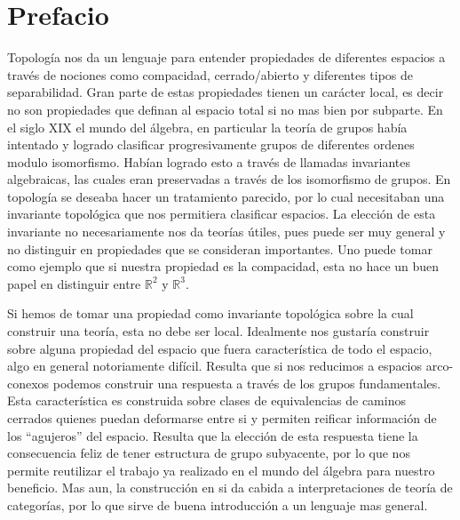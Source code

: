 \section{Prefacio}
Topología nos da un lenguaje para entender propiedades de diferentes
espacios a través de nociones como compacidad, cerrado/abierto y
diferentes tipos
de separabilidad. Gran parte de estas propiedades tienen un carácter
local, es decir no son propiedades que definan al espacio total si no mas
bien por subparte. En el siglo XIX el mundo del álgebra, en
particular la teoría de grupos había intentado y logrado clasificar
progresivamente grupos de diferentes ordenes modulo isomorfismo. Habían
logrado esto a través de llamadas invariantes algebraicas, las cuales
eran preservadas a través de los isomorfismo de grupos. En topología se
deseaba hacer un tratamiento parecido, por lo cual necesitaban una
invariante topológica que nos permitiera clasificar espacios. La elección
de esta invariante no necesariamente nos da teorías útiles, pues puede
ser muy general y no distinguir en propiedades que se consideran
importantes. Uno puede tomar como ejemplo que si nuestra propiedad es
la compacidad, esta no hace un buen papel en distinguir entre
\(\mathbb{R}^2\) y \(\mathbb{R}^3\).

Si hemos de tomar una propiedad como invariante topológica sobre la cual
construir una teoría, esta no debe ser local. Idealmente nos gustaría
construir sobre alguna propiedad del espacio que fuera característica de
todo el espacio, algo en general notoriamente difícil. Resulta que si nos
reducimos a espacios arco-conexos podemos construir una respuesta a través
de los grupos fundamentales. Esta característica es construida sobre
clases de equivalencias de caminos cerrados quienes puedan deformarse
entre si y permiten reificar información de los ``agujeros'' del espacio.
Resulta que la elección de esta respuesta tiene la consecuencia feliz de
tener estructura de grupo subyacente, por lo que nos permite reutilizar
el trabajo ya realizado en el mundo del álgebra para nuestro beneficio.
Mas aun, la construcción en si da cabida a interpretaciones de
teoría de categorías, por lo que sirve de buena introducción a un
lenguaje mas general.
